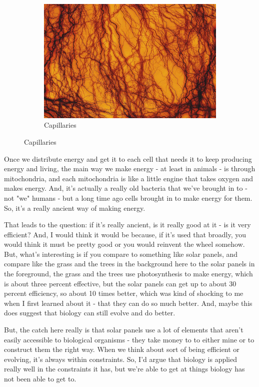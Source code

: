\documentclass[]{article}
\begin{document}
\begin{figure}[H]
\begin{subfigure}[t]{0.4\textwidth}
	\end{subfigure}
	\;\;\;
	\begin{subfigure}[t]{0.55\textwidth}
		\caption{Capillaries}\label{fig:distribution2}
		\includegraphics[width=\textwidth]{distribution2}
	\end{subfigure}
\end{figure}


Once we distribute energy
and get it to each cell that needs it
to keep producing energy and living,
the main way we make energy -
at least in animals -
is through mitochondria,
and each mitochondria
is like a little engine
that takes oxygen and makes energy.
And, it's actually a really old bacteria
that we've brought in to -
not "we" humans -
but a long time ago
cells brought in to make energy for them.
So, it's a really ancient way
of making energy.

That leads to the question:
if it's really ancient,
is it really good at it -
is it very efficient?
And, I would think it would be
because, if it's used that broadly,
you would think it must be pretty good
or you would reinvent the wheel somehow.
But, what's interesting is
if you compare to something like solar panels,
and compare like the grass
and the trees in the background here
to the solar panels in the foreground,
the grass and the trees
use photosynthesis to make energy,
which is about three percent effective,
but the solar panels can get up to
about 30 percent efficiency,
so about 10 times better,
which was kind of shocking to me
when I first learned about it -
that they can do so much better.
And, maybe this does suggest
that biology can still evolve
and do better.

But, the catch here really is that
solar panels use a lot of elements
that aren't easily accessible
to biological organisms -
they take money to to either mine
or to construct them the right way.
When we think about
sort of being efficient or evolving,
it's always within constraints.
So, I'd argue that biology is applied
really well in the constraints it has,
but we're able to get at things
biology has not been able to get to.
\end{document}

